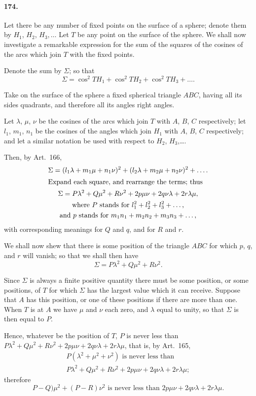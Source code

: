 \documentclass{book}[2004/02/16]
\begin{document}
\begin{mainmatter}
\begin{spacing}{1.3}
\paragraph{174.} Let there be any number of fixed points on the surface
of a sphere; denote them by $H_1$, $H_2$, $H_3,\dots$ Let $T$ be any point on
the surface of the sphere. We shall now investigate a remarkable
expression for the sum of the squares of the cosines of the arcs
which join $T$ with the fixed points.

Denote the sum by $\Sigma$; so that
\[
\Sigma = \cos^2 TH_1 + \cos^2 TH_2 + \cos^2 TH_3 + \dots.
\]

Take on the surface of the sphere a fixed spherical triangle
$ABC$, having all its sides quadrants, and therefore all its angles
right angles.

Let $\lambda$, $\mu$, $\nu$ be the cosines of the arcs which join $T$ with $A$, $B$, $C$
respectively; let $l_1$, $m_1$, $n_1$ be the cosines of the angles which join
$H_1$ with $A$, $B$, $C$ respectively; and let a similar notation be used
with respect to $H_2$, $H_3$,\dots.

Then, by Art.\ 166,
\begin{gather*}
\Sigma = (l_1\lambda + m_1\mu + n_1\nu)^2 + (l_2\lambda + m_2\mu + n_2\nu)^2 + \dots.\\
\intertext{Expand each square, and rearrange the terms; thus}
\Sigma = P\lambda^2 + Q\mu^2 + R\nu^2 + 2p\mu\nu + 2q\nu\lambda + 2r\lambda \mu,\\
\text{where $P$ stands for $l_1^2 + l_2^2 + l_3^2 + \dots$,}\\
\text{and $p$ stands for $m_1n_1 + m_2n_2 + m_3n_3 + \dots$,}
\end{gather*}
with corresponding meanings for $Q$ and $q$, and for $R$ and $r$.

We shall now shew that there is some position of the triangle
$ABC$ for which $p$, $q$, and $r$ will vanish; so that we shall then
have
\[
\Sigma=P\lambda^2+Q\mu^2+R\nu^2.
\]

Since $\Sigma$ is always a finite positive quantity there must be some
position, or some positions, of $T$ for which $\Sigma$ has the largest value
which it can receive. Suppose that $A$ has this position, or one
of these positions if there are more than one. When $T$ is at $A$
we have $\mu$ and $\nu$ each zero, and $\lambda$ equal to unity, so that $\Sigma$ is then
equal to $P$.

Hence, whatever be the position of $T$,
$P$ is never less than $P\lambda^2+Q\mu^2+R\nu^2+2p\mu\nu+2q\nu\lambda+2r\lambda\mu$,
that is, by Art.~165,
\begin{gather*}
P(\lambda^2+\mu^2+\nu^2) \text{ is never less than}
\\
P\lambda^2+Q\mu^2+R\nu^2+2p\mu\nu+2q\nu\lambda+2r\lambda\mu;
\end{gather*}
therefore\\[-2ex]
\[
P-Q)\mu^2+(P-R)\nu^2\text{ is never less than }2p\mu\nu+2q\nu\lambda+2r\lambda\mu.
\]


\end{spacing}
\end{mainmatter}
\end{document}

